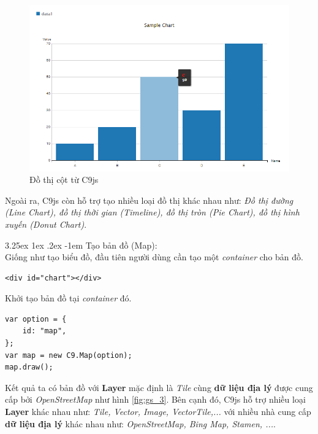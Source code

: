 \documentclass[12pt,a4paper]{article}
\makeatletter
\newcommand{\myparagraph}[1]{\paragraph{#1}\mbox{}\\} %
\renewcommand\paragraph{\@startsection{paragraph}{5}{\z@}%
  {3.25ex \@plus1ex \@minus.2ex}%
  {-1em}%
  {\normalfont\normalsize\bfseries}}
\makeatother
\begin{document}
\begin{figure}[htp]
	\begin{center}
    \includegraphics[scale=.7]{image/gs_2}
    \caption{Đồ thị cột từ C9js}
    \label{fig:gs_2}
	\end{center}
\end{figure}

Ngoài ra, C9js còn hỗ trợ tạo nhiều loại đồ thị khác nhau như: \textit{Đồ thị đường (Line Chart), đồ thị thời gian (Timeline), đồ thị tròn (Pie Chart), đồ thị hình xuyến (Donut Chart)}.

\myparagraph{Tạo bản đồ (Map):}
Giống như tạo biểu đồ, đầu tiên người dùng cần tạo một \textit{container} cho bản đồ.

\begin{lstlisting}[caption=Tạo \textit{container} để chứa bản đồ]
<div id="chart"></div>
\end{lstlisting}

Khởi tạo bản đồ tại \textit{container} đó.

\begin{lstlisting}[caption=Khởi tạo bản đồ với C9js]
var option = {
    id: "map",
};
var map = new C9.Map(option);
map.draw();
\end{lstlisting}

Kết quả ta có bản đồ với \textbf{Layer} mặc định là \textit{Tile} cùng \textbf{dữ liệu địa lý} được cung cấp bởi \textit{OpenStreetMap} như hình \ref{fig:gs_3}. Bên cạnh đó, C9js hỗ trợ nhiều loại \textbf{Layer} khác nhau như: \textit{Tile, Vector, Image, VectorTile,...} với nhiều nhà cung cấp \textbf{dữ liệu địa lý} khác nhau như: \textit{OpenStreetMap\citep{osm}, Bing Map\citep{bingmap}, Stamen\citep{stamen}, ...}.
\end{document}
